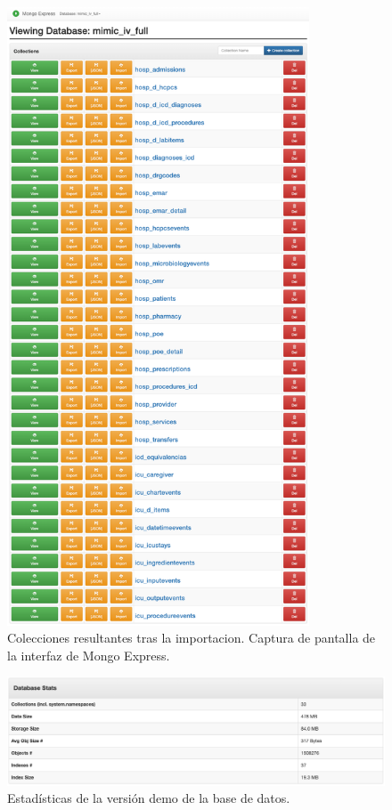 \begin{figure}[H]
    \centering
    \includegraphics[width=0.8\textwidth]{imagenes/db_full_list.png}
    \caption{Colecciones resultantes tras la importacion. Captura de pantalla de la interfaz de Mongo Express.}
    \label{fig:db_full_list}
\end{figure}

\begin{figure}[H]
    \centering
    \includegraphics[width=1\textwidth]{imagenes/stats_demo.png}
    \caption{Estadísticas de la versión demo de la base de datos.}
    \label{fig:stats_demo}
\end{figure}

